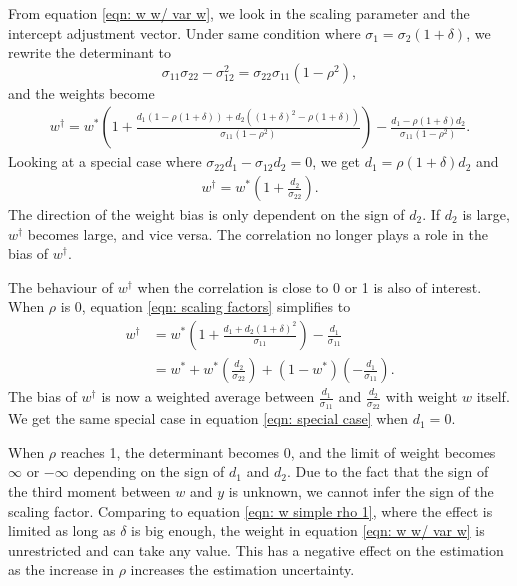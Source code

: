 \documentclass[11pt]{article}
\begin{document}
From equation \ref{eqn: w w/ var w}, we look in the scaling parameter
and the intercept adjustment vector. Under same condition where
\(\sigma_1 =\sigma_2 (1 + \delta)\), we rewrite the determinant to
\begin{equation}
\sigma_{11}\sigma_{22} - \sigma_{12}^2 = \sigma_{22}\sigma_{11} (1- \rho^2),
\end{equation}
and the weights become
\begin{equation}
\label{eqn: scaling factors}
\begin{aligned}
w^\dagger = w^*(1+\frac{d_1(1- \rho(1+\delta)) + d_2 ((1+\delta)^2-\rho(1+\delta))} {\sigma_{11} (1- \rho^2)}) - \frac{d_1-\rho(1+\delta) d_2}{\sigma_{11}(1- \rho^2)}.
\end{aligned}
\end{equation}
Looking at a special case where $\sigma_{22} d_1 - \sigma_{12}d_2=0$, we get $d_1=\rho(1+\delta) d_2$ and 
\begin{equation}
\label{eqn: special case}
\begin{aligned}
w^\dagger = w^*(1+\frac{d_2} {\sigma_{22}}).
\end{aligned}
\end{equation}
The direction of the weight bias is only dependent on the sign of $d_2$. If $d_2$ is large, $w^\dagger$ becomes large, and vice versa. The correlation no longer plays a role in the bias of $w^\dagger$.

The behaviour of $w^\dagger$ when the correlation is close to 0 or 1 is also of interest. When $\rho$ is 0, equation \ref{eqn: scaling factors} simplifies to 
\begin{equation}
\label{eqn: scaling factor rho 0}
\begin{aligned}
w^\dagger &= w^*(1+\frac{d_1 + d_2 (1+\delta)^2} {\sigma_{11} }) - \frac{d_1}{\sigma_{11}}\\
&=w^* +w^*(\frac{d_2}{\sigma_{22} }) + (1-w^*)(-\frac{d_1}{\sigma_{11}}).
\end{aligned}
\end{equation}
The bias of $w^\dagger$ is now a weighted average between $\frac{d_1}{\sigma_{11}}$ and $\frac{d_2}{\sigma_{22}}$ with weight $w$ itself. We get the same special case in equation \ref{eqn: special case} when $d_1=0$.

When $\rho$ reaches 1, the determinant becomes 0, and the limit of weight becomes $\infty$ or $-\infty$ depending on the sign of $d_1$ and $d_2$. Due to the fact that the sign of the third moment between $w$ and $y$ is unknown, we cannot infer the sign of the scaling factor. Comparing to equation \ref{eqn: w simple rho 1}, where the effect is limited as long as $\delta$ is big enough, the weight in equation \ref{eqn: w w/ var w} is unrestricted and can take any value. This has a negative effect on the estimation as the increase in $\rho$ increases the estimation uncertainty.
\end{document}

